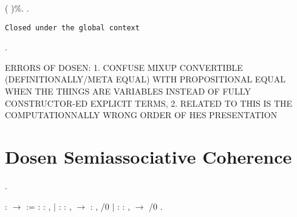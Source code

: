 \begin{coqdoccode}
(\coqdocnotation{(} \coqdocnotation{<}   \coqdoceol
\coqdocindent{4.50em}
  \coqdocnotation{<} \coqdocnotation{)} \coqdocnotation{\ensuremath{\times}}  )\%\coqdocnotation{\}}.\coqdoceol
\coqdocemptyline
\coqdocnoindent
{}  .\coqdoceol
\end{coqdoccode}
\begin{verbatim}
Closed under the global context
\end{verbatim}
\begin{coqdoccode}
\coqdocemptyline
\coqdocnoindent
{}  .\coqdoceol
\end{coqdoccode}
\coqdoceol
\coqdocemptyline
\coqdocnoindent
{}\coqdoceol
\coqdocnoindent
{}

\coqdocemptyline


 ERRORS OF DOSEN: 1. CONFUSE MIXUP CONVERTIBLE (DEFINITIONALLY/META EQUAL) WITH 
PROPOSITIONAL EQUAL WHEN THE THINGS ARE VARIABLES INSTEAD OF FULLY CONSTRUCTOR-ED
 EXPLICIT TERMS, 2. RELATED TO THIS IS THE COMPUTATIONNALLY WRONG ORDER 
OF HES PRESENTATION 

\section{Dosen Semiassociative Coherence}

\begin{coqdoccode}
\coqdocemptyline
\coqdocnoindent
{} .\coqdoceol
\end{coqdoccode}
\coqdoceol
\coqdocemptyline
\coqdocnoindent
{}  :  \ensuremath{\rightarrow}  :=\coqdoceol
\coqdocindent{2.00em}
 : \coqdockw{\ensuremath{\forall}}  : , \coqdoceol
\coqdocindent{1.00em}
\ensuremath{|}  : \coqdockw{\ensuremath{\forall}}  : ,  \ensuremath{\rightarrow} \coqdockw{\ensuremath{\forall}}  : ,  /0 \coqdoceol
\coqdocindent{1.00em}
\ensuremath{|}  : \coqdockw{\ensuremath{\forall}}   : ,  \ensuremath{\rightarrow}  /0 .

